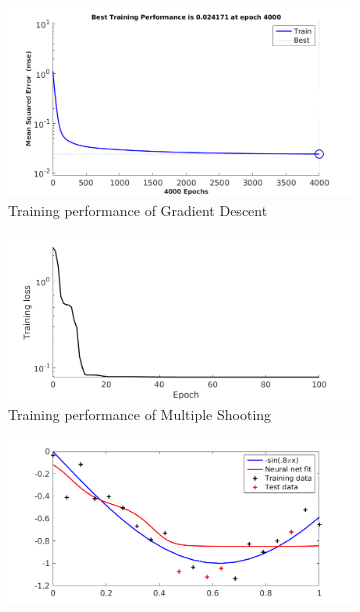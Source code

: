\begin{figure}
     \centering
     \begin{subfigure}[b]{0.4\textwidth}
         \centering
         \includegraphics[width=\textwidth]{gdtrain}
         \caption{Training performance of Gradient Descent}
         \label{gdtrain}
     \end{subfigure}
     \begin{subfigure}[b]{0.4\textwidth}
         \centering
         \includegraphics[width=\textwidth]{fmintrain}
         \caption{Training performance of Multiple Shooting}
         \label{fmintrain}
     \end{subfigure}
     \begin{subfigure}[b]{0.45\textwidth}
         \centering
         \includegraphics[width=\textwidth]{gdfit}

\end{subfigure}
\end{figure}
